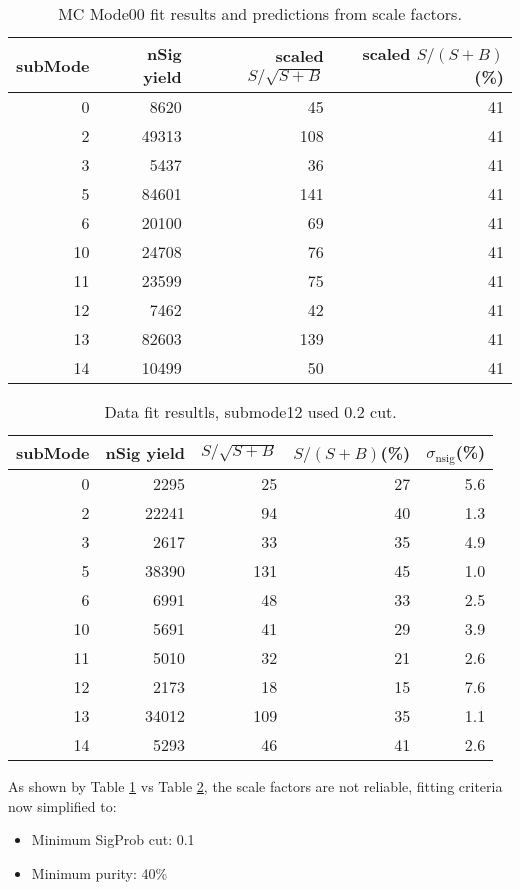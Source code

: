 \documentclass{article}
\begin{document}
\newpage
\begin{table}[h!]
\begin{center}
\begin{tabular}{rrrr}
\hline
subMode& nSig yield& scaled $S/\sqrt{S+B}$ & scaled $S/(S+B)$(\%)\\
\hline
0 & 8620 & 45 & 41 \\
2 & 49313 & 108 & 41 \\
3 & 5437 & 36 & 41 \\
5 & 84601 & 141 & 41 \\
6 & 20100 & 69 & 41 \\
10 & 24708 & 76 & 41 \\
11 & 23599 & 75 & 41 \\
12 & 7462 & 42 & 41 \\
13 & 82603 & 139 & 41 \\
14 & 10499 & 50 & 41 \\
\hline
\end{tabular}
\caption{MC Mode00 fit results and predictions from scale factors.}
\label{tab:MCFit01}
\end{center}
\end{table}

\begin{table}[h!]
\begin{center}
\begin{tabular}{rrrrr}
\hline
subMode& nSig yield& $S/\sqrt{S+B}$ & $S/(S+B)$(\%) & $\sigma_{\mbox{nsig}}$(\%)\\
\hline
0 &  	2295 	&  	25 	& 	27 	&	5.6	\\
2 & 	22241 	& 	94 	& 	40 	&	1.3	\\
3 &  	2617 	& 	33 	& 	35 	&	4.9	\\
5 & 	38390	&	131	&	45	&	1.0	\\
6 & 	6991 	& 	48 	& 	33	&	2.5 	\\
10 & 5691 	& 	41	&	29	&	3.9 	\\
11 & 5010 	& 	32	& 	21 	&	2.6 	\\
12 & 2173		& 	18	& 	15	&	7.6	\\
13 & 34012	&	109	& 	35	& 	1.1 	\\
14 & 5293		& 	46	& 	41	& 	2.6	\\
\hline
\end{tabular}
\caption{Data fit resultls, submode12 used 0.2 cut.}
\label{tab:DatFit01}
\end{center}
\end{table}

\newpage
As shown by Table \ref{tab:MCFit01} vs Table \ref{tab:DatFit01},
the scale factors are not reliable, fitting criteria now simplified to: 
\begin{itemize}
\item Minimum SigProb cut: 0.1
\item Minimum purity: 40\%
\end{itemize}
\end{document}
